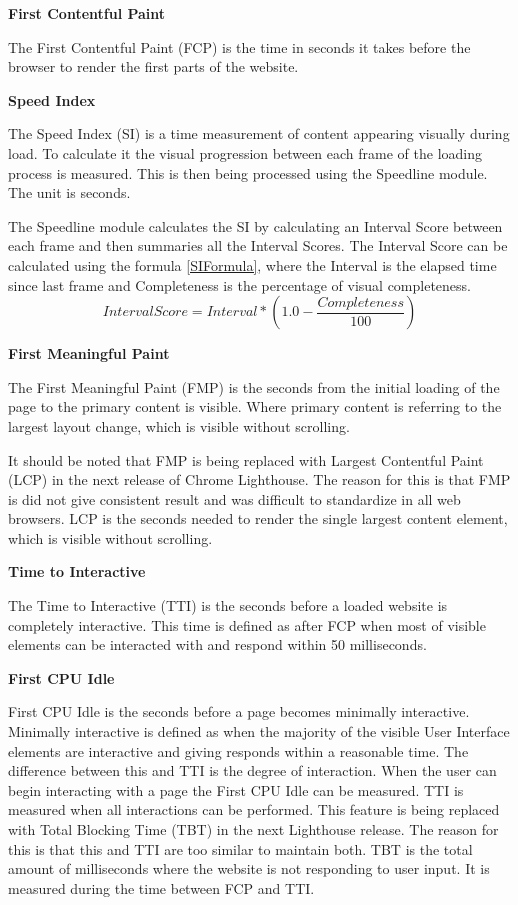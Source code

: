 



\textbf{First Contentful Paint}

The First Contentful Paint (FCP) is the time in seconds it takes before the browser to render the first parts of the website. 
\citep{FCP}


\textbf{Speed Index}

The Speed Index (SI) is a time measurement of content appearing visually during load. To calculate it the visual progression between each frame of the loading process is measured. This is then being processed using the Speedline module. The unit is seconds. \citep{PerSI}

The Speedline module calculates the SI by calculating an Interval Score between each frame and then summaries all the Interval Scores. The Interval Score can be calculated using the formula \ref{SIFormula}, where the Interval is the elapsed time since last frame and Completeness is the percentage of visual completeness. \citep{SIformula}
\begin{equation}
 IntervalScore = Interval * \left( 1.0 - \frac{Completeness}{100} \right)
\end{equation}\label{SIFormula}


\textbf{First Meaningful Paint}

The First Meaningful Paint (FMP) is the seconds from the initial loading of the page to the primary content is visible. Where primary content is referring to the largest layout change, which is visible without scrolling.

It should be noted that FMP is being replaced with Largest Contentful Paint (LCP) in the next release of Chrome Lighthouse. The reason for this is that FMP is did not give consistent result and was difficult to standardize in all web browsers. \citep{FMP}
LCP is the seconds needed to render the single largest content element, which is visible without scrolling.\citep{LCP}

\textbf{Time to Interactive}

The Time to Interactive (TTI) is the seconds before a loaded website is completely interactive. This time is defined as after FCP when most of visible elements can be interacted with and respond within 50 milliseconds. 
\citep{TTI}

\textbf{First CPU Idle}

First CPU Idle is the seconds before a page becomes minimally interactive. Minimally interactive is defined as when the majority of the visible User Interface elements are interactive and giving responds within a reasonable time. 
The difference between this and TTI is the degree of interaction. When the user can begin interacting with a page the First CPU Idle can be measured. TTI is measured when all interactions can be performed. 
This feature is being replaced with Total Blocking Time (TBT) in the next Lighthouse release. The reason for this is that this and TTI are too similar to maintain both. 
\citep{FCPUI}
TBT is the total amount of milliseconds where the website is not responding to user input. It is measured during the time between FCP and TTI. 
\citep{TBT}

